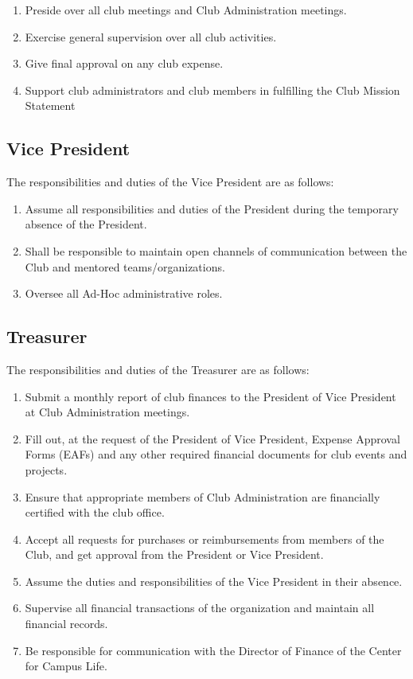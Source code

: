 \documentclass[english,11pt]{article}
\begin{document}
\begin{enumerate}[label=\Alph*.]
\item Preside over all club meetings and Club Administration meetings.
\item Exercise general supervision over all club activities.
\item Give final approval on any club expense.
\item Support club administrators and club members in fulfilling the Club Mission Statement
\end{enumerate}

\subsection{Vice President}
The responsibilities and duties of the Vice President are as follows:

\begin{enumerate}[label=\Alph*.]	
\item Assume all responsibilities and duties of the President during the temporary absence of the President.
\item Shall be responsible to maintain open channels of communication between the Club and mentored teams/organizations.
\item Oversee all Ad-Hoc administrative roles.
\end{enumerate}

\subsection{Treasurer}
The responsibilities and duties of the Treasurer are as follows:

\begin{enumerate}[label=\Alph*.]
\item Submit a monthly report of club finances to the President of Vice President at Club Administration meetings.
\item Fill out, at the request of the President of Vice President, Expense Approval Forms (EAFs) and any other required financial documents for club events and projects.
\item Ensure that appropriate members of Club Administration are financially certified with the club office.
\item Accept all requests for purchases or reimbursements from members of the Club, and get approval from the President or Vice President.
\item Assume the duties and responsibilities of the Vice President in their absence.
\item Supervise all financial transactions of the organization and maintain all financial records.
\item Be responsible for communication with the Director of Finance of the Center for Campus Life.
\end{enumerate}
\end{document}
